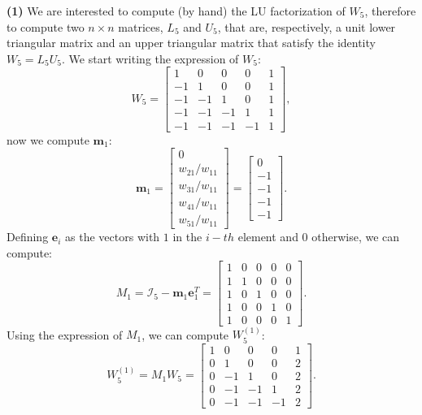\documentclass[a4paper,11pt]{article}
\begin{document}
\noindent \textbf{(1)} We are interested to compute (by hand) the LU factorization of $W_{5}$, therefore to compute two $n \times n$ matrices, $L_5$ and $U_5$, that are, respectively, a unit lower triangular matrix and an upper triangular matrix that satisfy the identity $W_5 = L_5 U_5$. We start writing the expression of $W_5$:
\begin{equation}\label{key}
	W_5 = 
	\begin{bmatrix}
		1 & 0  & 0  & 0  & 1  \\
		-1 & 1 & 0 & 0 & 1 \\
		-1 & -1 & 1 & 0 & 1 \\
		-1 & -1 & -1 & 1 & 1 \\
		-1 & -1 & -1 & -1 & 1 
	\end{bmatrix},
\end{equation}
now we compute $\textbf{m}_1$:
\begin{equation}\label{key}
	\textbf{m}_1 = 
	\begin{bmatrix}
		0\\
		{w_{21}}/{w_{11}}\\
		{w_{31}}/{w_{11}}\\
		{w_{41}}/{w_{11}}\\
		{w_{51}}/{w_{11}}
	\end{bmatrix}=
	\begin{bmatrix}
		0\\
		-1\\
		-1\\
		-1\\
		-1
	\end{bmatrix}.
\end{equation}
Defining $\textbf{e}_i$ as the vectors with $1$ in the $i-th$ element and $0$ otherwise, we can compute:
\begin{equation}\label{key}
	M_1=\mathcal{I}_5 - \textbf{m}_1 \textbf{e}_1^T =
	\begin{bmatrix}
		1 & 0  & 0  & 0  & 0  \\
		1 & 1 & 0 & 0 & 0\\
		1 & 0 & 1 & 0 & 0 \\
		1 & 0 & 0 & 1 & 0 \\
		1 & 0 & 0 & 0 & 1 
	\end{bmatrix}.
\end{equation}
Using the expression of $M_1$, we can compute $W_5^{(1)}$:
\begin{equation}\label{key}
	W_5^{(1)} = M_1 W_5 = 
	\begin{bmatrix}
		1 & 0  & 0  & 0  & 1  \\
		0 & 1 & 0 & 0 & 2 \\
		0 & -1 & 1 & 0 & 2 \\
		0 & -1 & -1 & 1 & 2 \\
		0 & -1 & -1 & -1 & 2 
	\end{bmatrix}.
\end{equation}
\end{document}
